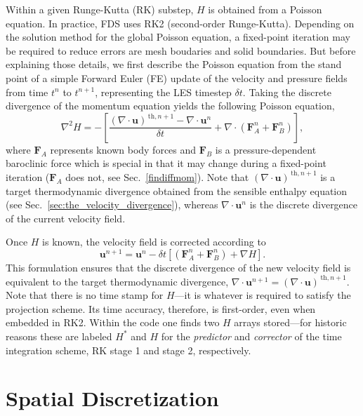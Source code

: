 Within a given Runge-Kutta (RK) substep, $H$ is obtained from a Poisson equation.  In practice, FDS uses RK2 (second-order Runge-Kutta).  Depending on the solution method for the global Poisson equation, a fixed-point iteration may be required to reduce errors are mesh boudaries and solid boundaries.  But before explaining those details, we first describe the Poisson equation from the stand point of a simple Forward Euler (FE) update of the velocity and pressure fields from time $t^n$ to $t^{n+1}$, representing the LES timestep $\delta t$.  Taking the discrete divergence of the momentum equation yields the following Poisson equation,
\begin{equation}
\nabla^2 H
=
-
\left[
\frac{(\nabla \cdot \mathbf{u})^{\,\mathrm{th},n+1} - \nabla \cdot \mathbf{u}^n}{\delta t}
+
\nabla \cdot (\mathbf{F}_A^n + \mathbf{F}_B^n)
\right],
\label{eq:poisson_H}
\end{equation}
where $\mathbf{F}_A$ represents known body forces and $\mathbf{F}_B$ is a pressure-dependent baroclinic force which is special in that it may change during a fixed-point iteration ($\mathbf{F}_A$ does not, see Sec.~\ref{findiffmom}).  Note that $(\nabla \cdot \mathbf{u})^{\,\mathrm{th},n+1}$ is a target thermodynamic divergence obtained from the sensible enthalpy equation (see Sec.~\ref{sec:the_velocity_divergence}), whereas $\nabla \cdot \mathbf{u}^n$ is the discrete divergence of the current velocity field.

Once $H$ is known, the velocity field is corrected according to
\begin{equation}
\mathbf{u}^{n+1} = \mathbf{u}^n - \delta t \left[ (\mathbf{F}_A^n + \mathbf{F}_B^n) + \nabla H \right].
\label{eq:velocity_update}
\end{equation}
This formulation ensures that the discrete divergence of the new velocity field is equivalent to the target thermodynamic divergence, $\nabla \cdot \mathbf{u}^{n+1} = (\nabla \cdot \mathbf{u})^{\,\mathrm{th},n+1}$.  Note that there is no time stamp for $H$---it is whatever is required to satisfy the projection scheme.  Its time accuracy, therefore, is first-order, even when embedded in RK2.  Within the code one finds two $H$ arrays stored---for historic reasons these are labeled $H^*$ and $H$ for the \emph{predictor} and \emph{corrector} of the time integration scheme, RK stage 1 and stage 2, respectively.

\section{Spatial Discretization}


